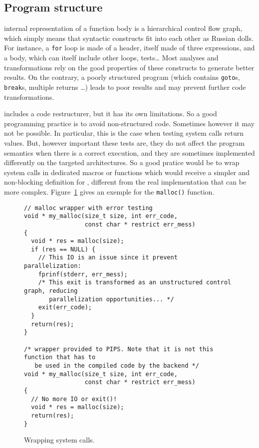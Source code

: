 \documentclass[a4paper]{article}
\begin{document}
\subsection{Program structure}
\label{sec:program-structure}

\Apips internal representation of a function body is a hierarchical
control flow graph, which simply means that syntactic constructs fit
into each other as Russian dolls. For instance, a \texttt{for} loop is
made of a header, itself made of three expressions, and a body, which
can itself include other loops, tests\ldots{} Most analyses and
transformations rely on the good properties of these constructs to
generate better results. On the contrary, a poorly structured program
(which contains \texttt{goto}s, \texttt{break}s, multiple {return}s
\ldots) leads to poor results and may prevent further code
transformations.

\Apips includes a code restructurer, but it has its own limitations. So a
good programming practice is to avoid non-structured code. Sometimes
however it may not be possible. In particular, this is the case when
testing system calls return values. But, however important these tests
are, they do not affect the program semantics when there is a correct
execution, and they are sometimes implemented differently on the targeted
architectures. So a good pratice would be to wrap system calls in
dedicated macros or functions which would receive a simpler and
non-blocking definition for \Apips, different from the real implementation
that can be more complex. Figure~\ref{fig:wrapping_system_calls} gives an
exemple for the \texttt{malloc()} function.

\begin{figure}
\begin{lstlisting}
// malloc wrapper with error testing
void * my_malloc(size_t size, int err_code,
                 const char * restrict err_mess)
{
  void * res = malloc(size);
  if (res == NULL) {
    // This IO is an issue since it prevent parallelization:
    fprinf(stderr, err_mess);
    /* This exit is transformed as an unstructured control graph, reducing
       parallelization opportunities... */
    exit(err_code);
  }
  return(res);
}

/* wrapper provided to PIPS. Note that it is not this function that has to
   be used in the compiled code by the backend */
void * my_malloc(size_t size, int err_code,
                 const char * restrict err_mess)
{
  // No more IO or exit()!
  void * res = malloc(size);
  return(res);
}
\end{lstlisting}

  \caption{Wrapping system calls.}
  \label{fig:wrapping_system_calls}
\end{figure}
\end{document}
